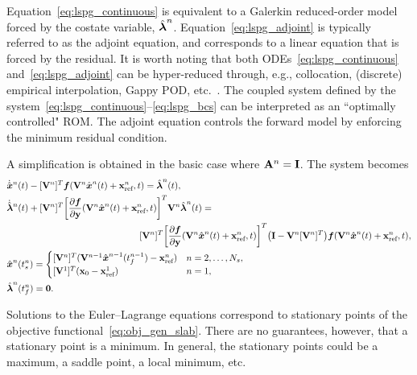 Equation~\eqref{eq:lspg_continuous} is equivalent to a Galerkin reduced-order
model forced by the costate variable, $\hat{\boldsymbol \lambda}^{n}$.
Equation~\eqref{eq:lspg_adjoint} is typically referred to as the adjoint
equation, and corresponds to a linear equation that is forced by the residual.
It is worth noting that both ODEs~\eqref{eq:lspg_continuous}
and~\eqref{eq:lspg_adjoint} can be hyper-reduced through, e.g.,
collocation, (discrete) empirical interpolation, Gappy POD, etc.~\cite{everson_sirovich_gappy,eim,qdeim_drmac}. The
coupled system defined by the system~\eqref{eq:lspg_continuous}--\eqref{eq:lspg_bcs} can be interpreted as an ``optimally controlled"
ROM. The adjoint equation controls the forward model by enforcing the minimum
residual condition.

A simplification is obtained in the basic case %
where $\mathbf{A}^{n} = \mathbf{I}$.
The system becomes
\begin{align*}\label{eq:lspg_continuous_simle} & \genstateDotArg{n}{t}  -
\basisspaceTArg{n}  \velocity(\veloargsromn) =  \adjointArg{n}{t} , \\
 &\adjointDotArg{n}{t}   + \basisspaceTArg{n} \bigg[\frac{\partial
\velocity}{\partial \stateyDiscrete}(\veloargsromn)\bigg]^T \basisspaceArg{n} \adjointArg{n}{t} = \\
&\hspace{2 in} \basisspaceTArg{n} \bigg[
\frac{\partial \velocity}{\partial \stateyDiscrete} (\veloargsromn) \bigg]^T \big( \mathbf{I} -   \basisspaceArg{n} \basisspaceTArg{n}
\big)    \velocity(\veloargsromn) , \\ & \genstateArg{n}{\timeStartArg{n}} =
\begin{cases} \basisspaceTArg{n}(\basisspaceArg{n-1}\genstateArg{n-1}{\timeEndArg{n-1}} - \stateInterceptArg{n})& n=2,\ldots,\nslabs, \\
\genstateICOne& n=1, \end{cases}\\
&\adjointArg{n}{\timeEndArg{n}} = \boldsymbol 0 .  \end{align*}
\begin{remark}
Solutions to the Euler--Lagrange equations correspond to stationary points 
of the objective functional~\eqref{eq:obj_gen_slab}. There are no guarantees, 
however, that a stationary point is a minimum. In general, the stationary 
points could be a maximum, a saddle point, a local minimum, etc.
\end{remark}

